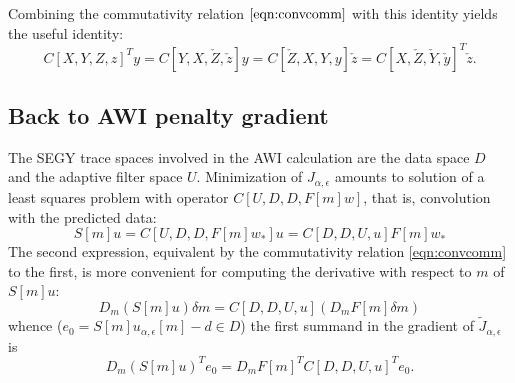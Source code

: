 Combining the commutativity relation $\ref{eqn:convcomm}$ with this identity yields the useful identity:
\begin{equation}
C[X,Y,Z,z]^Ty = C[Y,X,\check{Z},\check{z}]y =
C[\check{Z},X,Y,y]\check{z} =
C[X,\check{Z},\check{Y},\check{y}]^T\check{z}.
\label{eqn:convcommtransp}
\end{equation}

\subsection{Back to AWI penalty gradient}

The SEGY trace spaces involved in the AWI calculation are the data space $D$ and the adaptive filter space $U$. Minimization of $J_{\alpha,\epsilon}$ amounts to solution of a least squares problem with operator $C[U,D,D,F[m]w]$, that is, convolution with the predicted data:
$$
S[m]u = C[U,D,D,F[m]w_*]u = C[D,D,U,u]F[m]w_*
$$
The second expression, equivalent by the commutativity relation \ref{eqn:convcomm} to the first, is more convenient for computing the derivative with respect to $m$ of $S[m]u$:
$$
D_m(S[m]u) \delta m = C[D,D,U,u](D_mF[m]\delta m)
$$
whence ($e_0 = S[m]u_{\alpha,\epsilon}[m]-d \in D$) the first summand in the gradient of $\tilde{J}_{\alpha,\epsilon}$ is
$$
D_m(S[m]u)^T e_0 = D_mF[m]^TC[D,D,U,u]^Te_0.
$$

